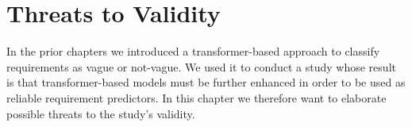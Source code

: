 \chapter{Threats to Validity}
\label{chp:threats_to_validity}
In the prior chapters we introduced a transformer-based approach to classify requirements as vague or not-vague.
We used it to conduct a study whose result is that transformer-based models must be further enhanced in order to be used as reliable requirement predictors.
In this chapter we therefore want to elaborate possible threats to the study's validity.






